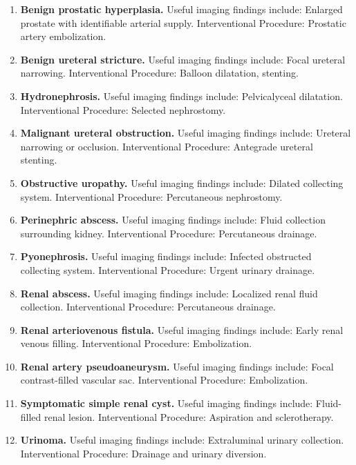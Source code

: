 \begin{enumerate}[leftmargin=*,itemsep=0.45em,topsep=0.4em]
\item \textbf{Benign prostatic hyperplasia.} Useful imaging findings include: Enlarged prostate with identifiable arterial supply. Interventional Procedure: Prostatic artery embolization.
\item \textbf{Benign ureteral stricture.} Useful imaging findings include: Focal ureteral narrowing. Interventional Procedure: Balloon dilatation, stenting.
\item \textbf{Hydronephrosis.} Useful imaging findings include: Pelvicalyceal dilatation. Interventional Procedure: Selected nephrostomy.
\item \textbf{Malignant ureteral obstruction.} Useful imaging findings include: Ureteral narrowing or occlusion. Interventional Procedure: Antegrade ureteral stenting.
\item \textbf{Obstructive uropathy.} Useful imaging findings include: Dilated collecting system. Interventional Procedure: Percutaneous nephrostomy.
\item \textbf{Perinephric abscess.} Useful imaging findings include: Fluid collection surrounding kidney. Interventional Procedure: Percutaneous drainage.
\item \textbf{Pyonephrosis.} Useful imaging findings include: Infected obstructed collecting system. Interventional Procedure: Urgent urinary drainage.
\item \textbf{Renal abscess.} Useful imaging findings include: Localized renal fluid collection. Interventional Procedure: Percutaneous drainage.
\item \textbf{Renal arteriovenous fistula.} Useful imaging findings include: Early renal venous filling. Interventional Procedure: Embolization.
\item \textbf{Renal artery pseudoaneurysm.} Useful imaging findings include: Focal contrast-filled vascular sac. Interventional Procedure: Embolization.
\item \textbf{Symptomatic simple renal cyst.} Useful imaging findings include: Fluid-filled renal lesion. Interventional Procedure: Aspiration and sclerotherapy.
\item \textbf{Urinoma.} Useful imaging findings include: Extraluminal urinary collection. Interventional Procedure: Drainage and urinary diversion.
\end{enumerate}


